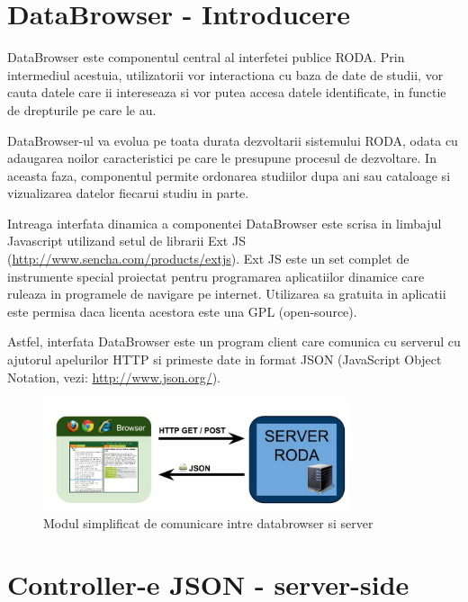 \section{DataBrowser - Introducere}
\label{databrowser}

DataBrowser este componentul central al interfetei publice RODA. Prin
intermediul acestuia, utilizatorii vor interactiona cu baza de date
de studii, vor cauta datele care ii intereseaza si vor putea accesa
datele identificate, in functie de drepturile pe care le au. 

DataBrowser-ul va evolua pe toata durata dezvoltarii sistemului RODA,
odata cu adaugarea noilor caracteristici pe care le presupune procesul
de dezvoltare. In aceasta faza, componentul permite ordonarea studiilor
dupa ani sau cataloage si vizualizarea datelor fiecarui studiu in
parte. 

Intreaga interfata dinamica a componentei DataBrowser este scrisa in limbajul
Javascript utilizand setul de librarii Ext JS (\url{http://www.sencha.com/products/extjs}). 
Ext JS este un set complet de instrumente special proiectat pentru programarea aplicatiilor
dinamice care ruleaza in programele de navigare pe internet.
Utilizarea sa gratuita in aplicatii este permisa daca licenta acestora este una GPL (open-source). 

Astfel, interfata DataBrowser este un program client care comunica cu serverul
cu ajutorul apelurilor HTTP si primeste date in format JSON 
(JavaScript Object Notation, vezi: \url{http://www.json.org/}).

\begin{figure}[H]
\begin{centering}
\includegraphics[width=9cm]{img/db-server}
\par\end{centering}
\caption{Modul simplificat de comunicare intre databrowser si server}
\end{figure}

\section{Controller-e JSON - server-side}

